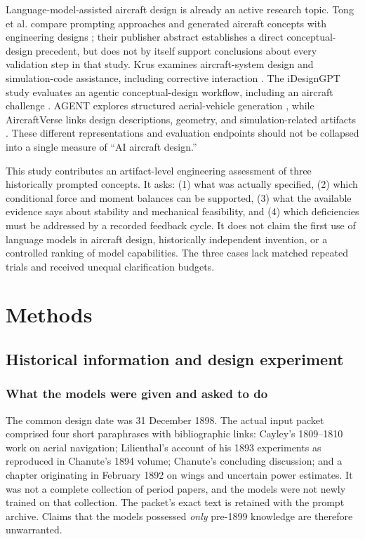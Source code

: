 \documentclass[10pt,letterpaper]{article}
\begin{document}
Language-model-assisted aircraft design is already an active research topic. Tong et al. compare prompting approaches and generated aircraft concepts with engineering designs \cite{ref25}; their publisher abstract establishes a direct conceptual-design precedent, but does not by itself support conclusions about every validation step in that study. Krus examines aircraft-system design and simulation-code assistance, including corrective interaction \cite{ref26}. The iDesignGPT study evaluates an agentic conceptual-design workflow, including an aircraft challenge \cite{ref27}. AGENT explores structured aerial-vehicle generation \cite{ref28}, while AircraftVerse links design descriptions, geometry, and simulation-related artifacts \cite{ref29}. These different representations and evaluation endpoints should not be collapsed into a single measure of ``AI aircraft design.''

This study contributes an artifact-level engineering assessment of three historically prompted concepts. It asks: (1) what was actually specified, (2) which conditional force and moment balances can be supported, (3) what the available evidence says about stability and mechanical feasibility, and (4) which deficiencies must be addressed by a recorded feedback cycle. It does not claim the first use of language models in aircraft design, historically independent invention, or a controlled ranking of model capabilities. The three cases lack matched repeated trials and received unequal clarification budgets.



\section{Methods}
\subsection{Historical information and design experiment}
\subsubsection{What the models were given and asked to do}
The common design date was 31 December 1898. The actual input packet comprised four short paraphrases with bibliographic links: Cayley's 1809--1810 work on aerial navigation; Lilienthal's account of his 1893 experiments as reproduced in Chanute's 1894 volume; Chanute's concluding discussion; and a chapter originating in February 1892 on wings and uncertain power estimates. It was not a complete collection of period papers, and the models were not newly trained on that collection. The packet's exact text is retained with the prompt archive. Claims that the models possessed \emph{only} pre-1899 knowledge are therefore unwarranted.
\end{document}
